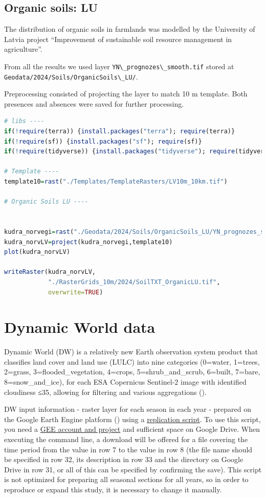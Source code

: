 \documentclass[
]{book}
\newcommand{\passthrough}[1]{#1}
\begin{document}
\subsection{Organic soils: LU}\label{Ch04.07.06}

The distribution of organic soils in farmlands was modelled by the University of
Latvia project ``Improvement of sustainable soil resource management in agriculture''.

From all the results we used layer \passthrough{\lstinline!YN\_prognozes\_smooth.tif!} stored
at \passthrough{\lstinline!Geodata/2024/Soils/OrganicSoils\_LU/!}.

Preprocessing consisted of projecting the layer to match 10 m template. Both presences
and absences were saved for further processing.

\begin{lstlisting}[language=R]
# libs ----
if(!require(terra)) {install.packages("terra"); require(terra)}
if(!require(sf)) {install.packages("sf"); require(sf)}
if(!require(tidyverse)) {install.packages("tidyverse"); require(tidyverse)}

# Template ----
template10=rast("./Templates/TemplateRasters/LV10m_10km.tif")

# Organic Soils LU ----


kudra_norvegi=rast("./Geodata/2024/Soils/OrganicSoils_LU/YN_prognozes_smooth.tif")
kudra_norvLV=project(kudra_norvegi,template10)
plot(kudra_norvLV)

writeRaster(kudra_norvLV,
            "./RasterGrids_10m/2024/SoilTXT_OrganicLU.tif",
            overwrite=TRUE)
\end{lstlisting}

\section{Dynamic World data}\label{Ch04.08}

Dynamic World (DW) is a relatively new Earth observation system product that
classifies land cover and land use (LULC) into nine categories (0=water, 1=trees,
2=grass, 3=flooded\_vegetation, 4=crops, 5=shrub\_and\_scrub, 6=built, 7=bare,
8=snow\_and\_ice), for each ESA Copernicus Sentinel-2 image with identified
cloudiness ≤35, allowing for filtering and various aggregations ().

DW input information - raster layer for each season in each year - prepared on
the Google Earth Engine platform () using
a \href{https://code.earthengine.google.com/0f9fd61ee41af11d218ce8692abebe9b}{replication script}.
To use this script, you need a \href{https://console.cloud.google.com/earth-engine/welcome}{GEE account and project}
and sufficient space on Google Drive. When executing the command line, a download
will be offered for a file covering the time period from the value in row 7 to
the value in row 8 (the file name should be specified in row 32, its
description in row 33 and the directory on Google Drive in row 31, or
all of this can be specified by confirming the save). This script is not optimized
for preparing all seasonal sections for all years, so in order to reproduce or
expand this study, it is necessary to change it manually.
\end{document}
